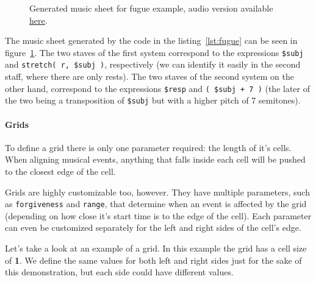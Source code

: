 \documentclass[a4paper,UKenglish,cleveref, autoref]{oasics-v2019}
\begin{document}
\begin{figure}[ht]
  \centering
  {%
  \setlength{\fboxsep}{0pt}%
  \setlength{\fboxrule}{0pt}%
  }%
  \caption{Generated music sheet for fugue example, audio version available \href{https://drive.google.com/open?id=1dIfvnhhKn73Vpp0W6ss6RLsv6PQ_HFTF}{\underline{here}}\protect\footnotemark.}
  \label{fig:fugue}
\end{figure}

The music sheet generated by the code in the listing~\ref{lst:fugue} can be seen in figure~\ref{fig:fugue}. The two staves of the first system correspond to the expressions \texttt{\$subj} and \texttt{stretch( r, \$subj )}, respectively (we can identify it easily in the second staff, where there are only rests). The two staves of the second system on the other hand, correspond to the expressions \texttt{\$resp} and \texttt{( \$subj + 7 )} (the later of the two being a transposition of \texttt{\$subj} but with a higher pitch of 7 semitones).

\paragraph*{Grids}
To define a grid there is only one parameter required: the length of it's cells. When aligning musical events, anything that falls inside each cell will be pushed to the closest edge of the cell.

Grids are highly customizable too, however. They have multiple parameters, such as \texttt{forgiveness} and \texttt{range}, that determine when an event is affected by the grid (depending on how close it's start time is to the edge of the cell). Each parameter can even be customized separately for the left and right sides of the cell's edge.

Let's take a look at an example of a grid. In this example the grid has a cell size of \textbf{1}. We define the same values for both left and right sides just for the sake of this demonstration, but each side could have different values.
\end{document}
